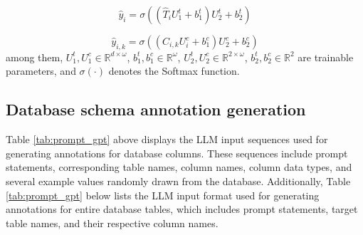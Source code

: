 \documentclass[11pt]{article}
\begin{document}
\begin{equation}
    \hat{y}_{i}=\sigma ((\hat{T}_{i}U_{1}^{t}+b_{1}^{t})U_{2}^{t}+b_{2}^{t})
\end{equation}

\begin{equation}
    \hat{y}_{i,k}=\sigma ((C_{i,k}U_{i}^{c}+b_{1}^{c})U_{2}^{c}+b_{2}^{c})
\end{equation}
among them, $ U_{1}^{t}, U_{1}^{c} \in \mathbb{R}^{d \times \omega} $, $ b_{1}^{t}, b_{1}^{c} \in \mathbb{R}^{\omega} $, $ U_{2}^{t}, U_{2}^{c} \in \mathbb{R}^{2 \times \omega} $, $ b_{2}^{t}, b_{2}^{c} \in \mathbb{R}^{2} $ are trainable parameters, and $ \sigma(\cdot) $ denotes the Softmax function.


\subsection{Database schema annotation generation}
\label{sec:annotation_prompt}

Table \ref{tab:prompt_gpt} above displays the LLM input sequences used for generating annotations for database columns. These sequences include prompt statements, corresponding table names, column names, column data types, and several example values randomly drawn from the database. Additionally, Table \ref{tab:prompt_gpt} below lists the LLM input format used for generating annotations for entire database tables, which includes prompt statements, target table names, and their respective column names.
\end{document}
